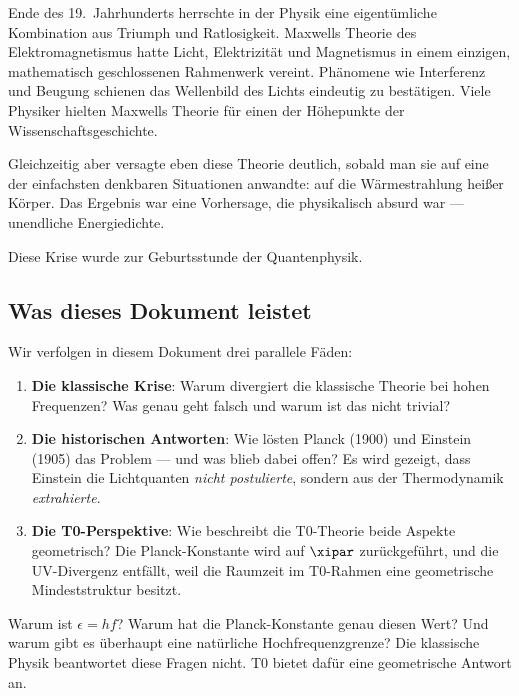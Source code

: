 Ende des 19.~Jahrhunderts herrschte in der Physik eine eigentümliche Kombination aus 
Triumph und Ratlosigkeit. Maxwells Theorie des Elektromagnetismus hatte Licht, 
Elektrizität und Magnetismus in einem einzigen, mathematisch geschlossenen Rahmenwerk 
vereint. Phänomene wie Interferenz und Beugung schienen das Wellenbild des Lichts 
eindeutig zu bestätigen. Viele Physiker hielten Maxwells Theorie für einen der 
Höhepunkte der Wissenschaftsgeschichte.

Gleichzeitig aber versagte eben diese Theorie deutlich, sobald man sie auf eine der 
einfachsten denkbaren Situationen anwandte: auf die Wärmestrahlung heißer Körper. Das 
Ergebnis war eine Vorhersage, die physikalisch absurd war — unendliche Energiedichte.

Diese Krise wurde zur Geburtsstunde der Quantenphysik.

\subsection{Was dieses Dokument leistet}

Wir verfolgen in diesem Dokument drei parallele Fäden:

\begin{enumerate}
    \item \textbf{Die klassische Krise}: Warum divergiert die klassische Theorie bei 
    hohen Frequenzen? Was genau geht falsch und warum ist das nicht trivial?
    
    \item \textbf{Die historischen Antworten}: Wie lösten Planck (1900) und Einstein 
    (1905) das Problem — und was blieb dabei offen? Es wird gezeigt, dass Einstein 
    die Lichtquanten \emph{nicht postulierte}, sondern aus der Thermodynamik 
    \emph{extrahierte}.
    
    \item \textbf{Die T0-Perspektive}: Wie beschreibt die T0-Theorie beide Aspekte 
    geometrisch? Die Planck-Konstante wird auf $\xipar$ zurückgeführt, und die UV-Divergenz 
    entfällt, weil die Raumzeit im T0-Rahmen eine geometrische Mindeststruktur besitzt.
\end{enumerate}

\begin{important}[Leitfrage]
    Warum ist $\epsilon = hf$? Warum hat die Planck-Konstante genau diesen Wert? 
    Und warum gibt es überhaupt eine natürliche Hochfrequenzgrenze? 
    Die klassische Physik beantwortet diese Fragen nicht. T0 bietet dafür eine geometrische Antwort an.
\end{important}

